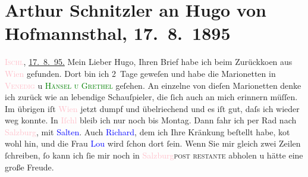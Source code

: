 

               \section[Arthur Schnitzler an Hugo von Hofmannsthal, 17. 8. 1895]{ Arthur Schnitzler an Hugo von Hofmannsthal, 17. 8. 1895}\nopagebreak{}\rehead{ }\normalsize\beginnumbering{} \toendnotes[C]{\smallbreak\pagebreak[2]} 
\toendnotes[C]{\smallbreak}\pstart
           \raggedleft{}{\pb}\textcolor{pink}{\textsc{Ischl}}{}\ledrightnote{\textcolor{pink}{Bad Ischl}}, \uline{17. 8. 95.}\pend
           \pstart
           Mein Lieber Hugo, Ihren Brief habe ich beim Zurückko{\geminationm}en aus \textcolor{pink}{Wien}{}\ledrightnote{\textcolor{pink}{Wien}}
                    gefunden. Dort bin ich 2 Tage geweſen und habe die Marionetten in \textcolor{pink}{\textsc{Venedig}}{}\ledrightnote{\textcolor{pink}{Venedig in Wien}} u \textcolor{green}{\textsc{Hänsel u Grethel}}{}\ledrightnote{\textcolor{green}{Hänsel und Grethel}} geſehen. An einzelne von dieſen Marionetten denke ich zurück wie an
                    lebendige Schauſpieler, die ſich auch an mich erinnern müſſen. Im übrigen iſt
                        \textcolor{pink}{Wien}{}\ledrightnote{\textcolor{pink}{Wien}} jetzt dumpf und übelriechend und es
                    iſt gut, daſs ich wieder weg konnte. In \textcolor{pink}{Iſchl}{}\ledrightnote{\textcolor{pink}{Bad Ischl}} bleib ich nur noch bis Montag. Dann fahr ich per Rad nach
                        \textcolor{pink}{Salzburg}{}\ledrightnote{\textcolor{pink}{Salzburg}}, mit \textcolor{blue}{Salten}{}\ledrightnote{\textcolor{blue}{Felix Salten}}. {\pb}Auch \textcolor{blue}{Richard}{}\ledrightnote{\textcolor{blue}{Richard Beer-Hofmann}}, dem ich Ihre Kränkung beſtellt habe, ko{\geminationm}t wohl hin, und die Frau \textcolor{blue}{Lou}{}\ledrightnote{\textcolor{blue}{Lou Andreas-Salomé}} wird ſchon dort ſein. Wenn Sie mir gleich zwei Zeilen
                    ſchreiben, ſo kann ich ſie mir noch in \textcolor{pink}{Salzburg}{}\ledrightnote{\textcolor{pink}{Salzburg}}{ }\textsc{post restante} abholen u hätte eine große Freude.
